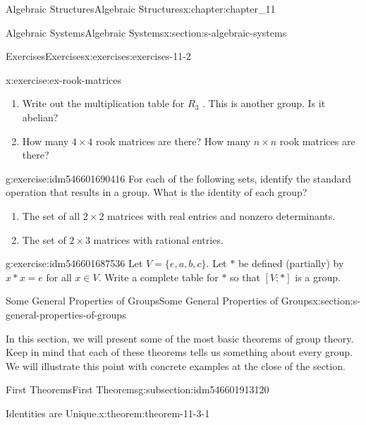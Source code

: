 \documentclass[oneside,10pt,]{book}
\numberwithin{equation}{section}
\begin{document}
\begin{chapterptx}{Algebraic Structures}{}{Algebraic Structures}{}{}{x:chapter:chapter_11}
\begin{sectionptx}{Algebraic Systems}{}{Algebraic Systems}{}{}{x:section:s-algebraic-systems}
\begin{exercises-subsection}{Exercises}{}{Exercises}{}{}{x:exercises:exercises-11-2}
\begin{divisionexercise}{5}{}{}{x:exercise:ex-rook-matrices}
\begin{enumerate}[label=(\alph*)]
\item{}Write out the multiplication table for \(R_3\) . This is another group. Is it abelian?%
\item{}How many \(4\times 4\) rook matrices are there? How many \(n\times  n\) rook matrices are there?%
\end{enumerate}
%
\end{divisionexercise}%
\begin{divisionexercise}{6}{}{}{g:exercise:idm546601690416}%
For each of the following sets, identify the standard operation that results in a group. What is the identity of each group?%
\begin{enumerate}[label=(\alph*)]
\item{}The set of all \(2\times 2\) matrices with real entries and nonzero determinants.%
\item{}The set of \(2 \times  3\) matrices with rational entries.%
\end{enumerate}
%
\end{divisionexercise}%
\begin{divisionexercise}{7}{}{}{g:exercise:idm546601687536}%
Let \(V = \{e,a,b, c\}\).  Let \(*\) be defined (partially) by \(x * x = e\) for all \(x \in  V\). Write a complete table for \(*\) so that \([V; * ]\) is a group.%
\end{divisionexercise}%
\end{exercises-subsection}
\end{sectionptx}
%
%
\typeout{************************************************}
\typeout{************************************************}
%
\begin{sectionptx}{Some General Properties of Groups}{}{Some General Properties of Groups}{}{}{x:section:s-general-properties-of-groups}
%
\begin{introduction}{}%
In this section, we will present some of the most basic theorems of group theory. Keep in mind that each of these theorems tells us something about every group. We will illustrate this point with concrete examples at the close of the section.%
\end{introduction}%
%
%
\typeout{************************************************}
\typeout{************************************************}
%
\begin{subsectionptx}{First Theorems}{}{First Theorems}{}{}{g:subsection:idm546601913120}
\begin{theorem}{Identities are Unique.}{}{x:theorem:theorem-11-3-1}%

\end{theorem}
\end{subsectionptx}
\end{sectionptx}
\end{chapterptx}
\end{document}
